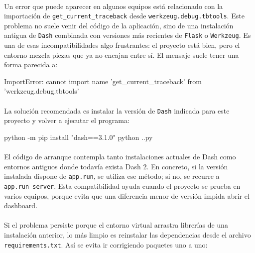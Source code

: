 \paragraph*{}Un error que puede aparecer en algunos equipos está relacionado con la importación de \texttt{get\_current\_traceback} desde \texttt{werkzeug.debug.tbtools}. Este problema no suele venir del código de la aplicación, sino de una instalación antigua de \texttt{Dash} combinada con versiones más recientes de \texttt{Flask} o \texttt{Werkzeug}. Es una de esas incompatibilidades algo frustrantes: el proyecto está bien, pero el entorno mezcla piezas que ya no encajan entre sí. El mensaje suele tener una forma parecida a:

\begin{bloquecomando}
ImportError: cannot import name 'get_current_traceback'
from 'werkzeug.debug.tbtools'
\end{bloquecomando}

\paragraph*{}La solución recomendada es instalar la versión de \texttt{Dash} indicada para este proyecto y volver a ejecutar el programa:

\begin{bloquecomando}
python -m pip install "dash==3.1.0"
python .\cargaDataset.py
\end{bloquecomando}

\paragraph*{}El código de arranque contempla tanto instalaciones actuales de Dash como entornos antiguos donde todavía exista Dash 2. En concreto, si la versión instalada dispone de \texttt{app.run}, se utiliza ese método; si no, se recurre a \texttt{app.run\_server}. Esta compatibilidad ayuda cuando el proyecto se prueba en varios equipos, porque evita que una diferencia menor de versión impida abrir el dashboard.

\paragraph*{}Si el problema persiste porque el entorno virtual arrastra librerías de una instalación anterior, lo más limpio es reinstalar las dependencias desde el archivo \texttt{requirements.txt}. Así se evita ir corrigiendo paquetes uno a uno:

